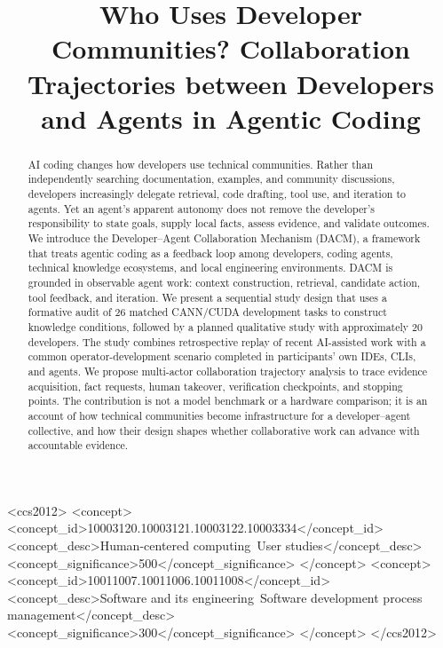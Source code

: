 \documentclass[manuscript,review,anonymous]{acmart}
\begin{document}
\title{Who Uses Developer Communities? Collaboration Trajectories between Developers and Agents in Agentic Coding}

\begin{abstract}
AI coding changes how developers use technical communities. Rather than independently searching documentation, examples, and community discussions, developers increasingly delegate retrieval, code drafting, tool use, and iteration to agents. Yet an agent's apparent autonomy does not remove the developer's responsibility to state goals, supply local facts, assess evidence, and validate outcomes. We introduce the Developer--Agent Collaboration Mechanism (DACM), a framework that treats agentic coding as a feedback loop among developers, coding agents, technical knowledge ecosystems, and local engineering environments. DACM is grounded in observable agent work: context construction, retrieval, candidate action, tool feedback, and iteration. We present a sequential study design that uses a formative audit of 26 matched CANN/CUDA development tasks to construct knowledge conditions, followed by a planned qualitative study with approximately 20 developers. The study combines retrospective replay of recent AI-assisted work with a common operator-development scenario completed in participants' own IDEs, CLIs, and agents. We propose multi-actor collaboration trajectory analysis to trace evidence acquisition, fact requests, human takeover, verification checkpoints, and stopping points. The contribution is not a model benchmark or a hardware comparison; it is an account of how technical communities become infrastructure for a developer--agent collective, and how their design shapes whether collaborative work can advance with accountable evidence.
\end{abstract}


\begin{CCSXML}
<ccs2012>
<concept>
<concept_id>10003120.10003121.10003122.10003334</concept_id>
<concept_desc>Human-centered computing~User studies</concept_desc>
<concept_significance>500</concept_significance>
</concept>
<concept>
<concept_id>10011007.10011006.10011008</concept_id>
<concept_desc>Software and its engineering~Software development process management</concept_desc>
<concept_significance>300</concept_significance>
</concept>
</ccs2012>
\end{CCSXML}
\end{document}
